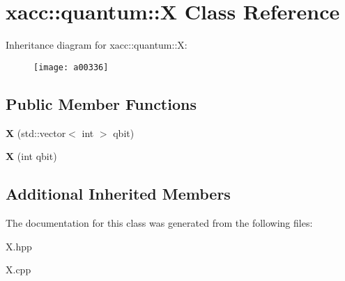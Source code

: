 \hypertarget{a00336}{}\section{xacc\+:\+:quantum\+:\+:X Class Reference}
\label{a00336}
Inheritance diagram for xacc\+:\+:quantum\+:\+:X\+:\begin{figure}[H]
\begin{center}
\leavevmode
\texttt{[image: a00336]}
\end{center}
\end{figure}
\subsection*{Public Member Functions}
\begin{DoxyCompactItemize}
\item 
{\bfseries X} (std\+::vector$<$ int $>$ qbit)\hypertarget{a00336_aedc541a302602154847118f73b040510}{}\label{a00336_aedc541a302602154847118f73b040510}

\item 
{\bfseries X} (int qbit)\hypertarget{a00336_a1159bd01929b59277b4524ccfcfd7440}{}\label{a00336_a1159bd01929b59277b4524ccfcfd7440}

\end{DoxyCompactItemize}
\subsection*{Additional Inherited Members}


The documentation for this class was generated from the following files\+:\begin{DoxyCompactItemize}
\item 
X.\+hpp\item 
X.\+cpp\end{DoxyCompactItemize}

